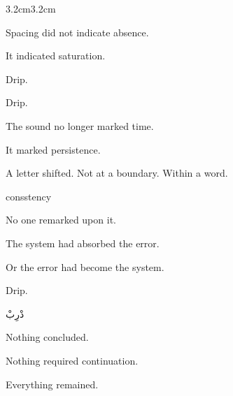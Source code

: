 \begin{adjustwidth}{3.2cm}{3.2cm}
\vspace{2em}

Spacing did not indicate absence.

\medskip

It indicated saturation.

\vspace{3em}

Drip.

\vspace{2em}

Drip.

\vspace{2em}


\vspace{2em}

The sound no longer marked time.

\medskip

It marked persistence.

\vspace{3em}

A letter shifted. Not at a boundary. Within a word.

\medskip

consstency

\vspace{2em}

No one remarked upon it.

\vspace{3em}

The system had absorbed the error.

\medskip

Or the error had become the system.

\vspace{3em}

Drip.

\vspace{2em}

\begin{AR}
دْرِبْ
\end{AR}

\vspace{2em}


\vspace{3em}

Nothing concluded.

\medskip

Nothing required continuation.

\medskip

Everything remained.

\end{adjustwidth}
